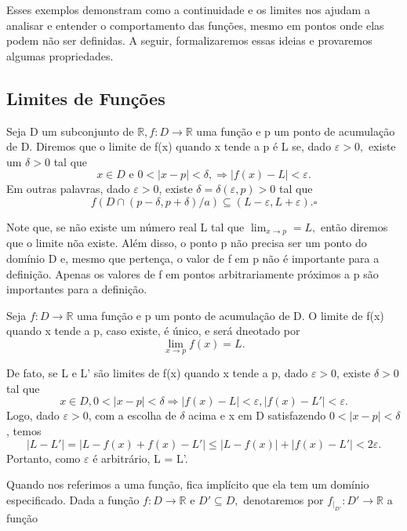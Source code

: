 \documentclass[analysis_notes.tex]{subfiles}
\begin{document}
Esses exemplos demonstram como a continuidade e os limites nos ajudam a analisar e entender o comportamento das funções, mesmo em pontos onde elas podem não ser definidas.
A seguir, formalizaremos essas ideias e provaremos algumas propriedades.

\subsection{Limites de Fun\c c\~oes}
\begin{def*}
	Seja D um subconjunto de $\mathbb{R}, f:D\rightarrow \mathbb{R}$ uma fun\c c\~ao e p um ponto de acumula\c c\~ao de D. Diremos que
	o limite de f(x) quando x tende a p \'e L se, dado $\varepsilon > 0,$ existe um $\delta > 0$ tal que
	$$
		x\in D\text{ e } 0 < |x-p| < \delta, \Rightarrow |f(x) - L | < \varepsilon.
	$$
	Em outras palavras, dado $\varepsilon > 0$, existe $\delta = \delta(\varepsilon, p) > 0$ tal que
	$$
		f(D\cap(p-\delta, p+\delta)/a)\subseteq{(L-\varepsilon, L+\varepsilon).} \square
	$$
\end{def*}
Note que, se n\~ao existe um n\'umero real L tal que $\lim_{x\to p}= L,$ ent\~ao diremos que o limite n\~oa existe. Al\'em disso,
o ponto p n\~ao precisa ser um ponto do dom\'inio D e, mesmo que perten\c ca, o valor de f em p n\~ao \'e importante para a defini\c c\~ao.
Apenas os valores de f em pontos arbitrariamente pr\'oximos a p s\~ao importantes para a defini\c c\~ao.
\begin{theorem*}
	Seja $f:D\rightarrow \mathbb{R}$ uma fun\c c\~ao e p um ponto de acumula\c c\~ao de D. O limite de f(x) quando x tende a p,
	caso existe, \'e \'unico, e ser\'a dneotado por
	$$
		\lim_{x\to p}f(x) = L.
	$$
\end{theorem*}
\begin{proof*}
	De fato, se L e L' s\~ao limites de f(x) quando x tende a p, dado $\varepsilon > 0$, existe $\delta > 0$ tal que
	$$
		x\in D, 0 < |x-p| < \delta \Rightarrow |f(x)- L| < \varepsilon, |f(x) - L'|< \varepsilon.
	$$
	Logo, dado $\varepsilon > 0$, com a escolha de $\delta$ acima e x em D satisfazendo $0 <|x-p|<\delta$, temos
	$$
		|L - L'| = |L -f(x) + f(x) - L'| \leq{} |L - f(x)| + |f(x) - L'| < 2\varepsilon.
	$$
	Portanto, como $\varepsilon$ \'e arbitr\'ario, L = L'. \qedsymbol
\end{proof*}
Quando nos referimos a uma fun\c c\~ao, fica impl\'icito que ela tem um dom\'inio especificado. Dada a fun\c c\~ao
$f:D\rightarrow \mathbb{R}$ e $D'\subseteq{D},$ denotaremos por $f_{|_{D'}}:D'\rightarrow \mathbb{R}$ a fun\c c\~ao
\end{document}
